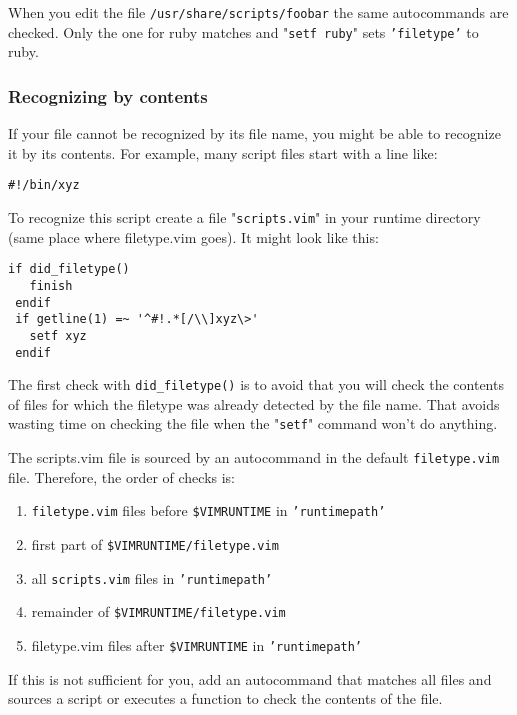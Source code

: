 When you edit the file \texttt{/usr/share/scripts/foobar} the same autocommands are checked.
Only the one for ruby matches and "\texttt{setf ruby}" sets \texttt{'filetype'} to ruby.

\subsubsection{Recognizing by contents}
If your file cannot be recognized by its file name, you might be able to recognize it by its contents.
For example, many script files start with a line like:

\begin{Verbatim}[samepage=true]
    #!/bin/xyz 
\end{Verbatim}

To recognize this script create a file "\texttt{scripts.vim}" in your runtime directory (same place where filetype.vim goes).
It might look like this:

\begin{Verbatim}[samepage=true]
 if did_filetype()
   finish
 endif
 if getline(1) =~ '^#!.*[/\\]xyz\>'
   setf xyz
 endif
\end{Verbatim}

The first check with \texttt{did\_filetype()} is to avoid that you will check the contents of files for which the filetype was already detected by the file name.
That avoids wasting time on checking the file when the "\texttt{setf}" command won't do anything.

The scripts.vim file is sourced by an autocommand in the default \texttt{filetype.vim} file.
Therefore, the order of checks is:

\begin{enumerate}
				\item \texttt{filetype.vim} files before \texttt{\$VIMRUNTIME} in \texttt{'runtimepath'}
				\item first part of \texttt{\$VIMRUNTIME/filetype.vim}
				\item all \texttt{scripts.vim} files in \texttt{'runtimepath'}
				\item remainder of \texttt{\$VIMRUNTIME/filetype.vim}
				\item filetype.vim files after \texttt{\$VIMRUNTIME} in \texttt{'runtimepath'}
\end{enumerate}

If this is not sufficient for you, add an autocommand that matches all files and sources a script or executes a function to check the contents of the file.
\clearpage
